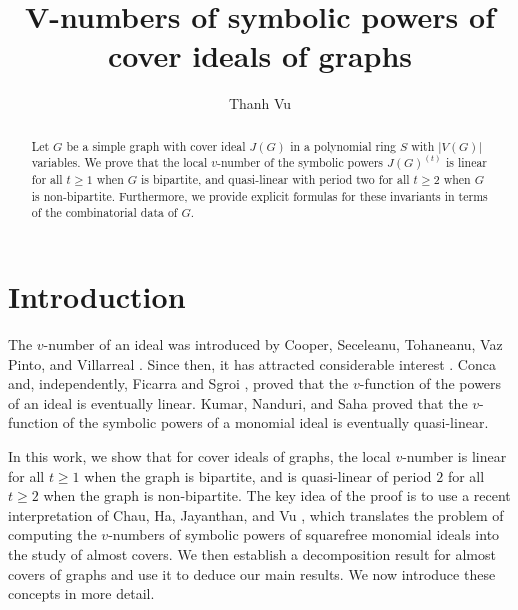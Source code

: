 \documentclass[12pt,amscd]{amsart}
\theoremstyle{definition}
\numberwithin{equation}{section}
\begin{document}
\title{V-numbers of symbolic powers of cover ideals of graphs}

\author{Thanh Vu}
\address{Institute of Mathematics, VAST, 18 Hoang Quoc Viet, Hanoi, Vietnam}



\date{}

 
\commby{}

\begin{abstract} Let $G$ be a simple graph with cover ideal $J(G)$ in a polynomial ring $S$ with $|V(G)|$ variables. We prove that the local $v$-number of the symbolic powers $J(G)^{(t)}$ is linear for all $t \ge 1$ when $G$ is bipartite, and quasi-linear with period two for all $t \ge 2$ when $G$ is non-bipartite. Furthermore, we provide explicit formulas for these invariants in terms of the combinatorial data of $G$.
\end{abstract}

\maketitle
\section{Introduction}
\label{sect_intro}
The $v$-number of an ideal was introduced by Cooper, Seceleanu, Tohaneanu, Vaz Pinto, and Villarreal \cite{CSTVV}. Since then, it has attracted considerable interest \cite{BM,BMS,FM,KNS,S}. Conca \cite{C} and, independently, Ficarra and Sgroi \cite{FS}, proved that the $v$-function of the powers of an ideal is eventually linear. Kumar, Nanduri, and Saha \cite{KNS} proved that the $v$-function of the symbolic powers of a monomial ideal is eventually quasi-linear.

In this work, we show that for cover ideals of graphs, the local $v$-number is linear for all $t\ge1$ when the graph is bipartite, and is quasi-linear of period $2$ for all $t\ge2$ when the graph is non-bipartite. The key idea of the proof is to use a recent interpretation of Chau, Ha, Jayanthan, and Vu \cite{CHJV}, which translates the problem of computing the $v$-numbers of symbolic powers of squarefree monomial ideals into the study of almost covers. We then establish a decomposition result for almost covers of graphs and use it to deduce our main results. We now introduce these concepts in more detail.
\end{document}
